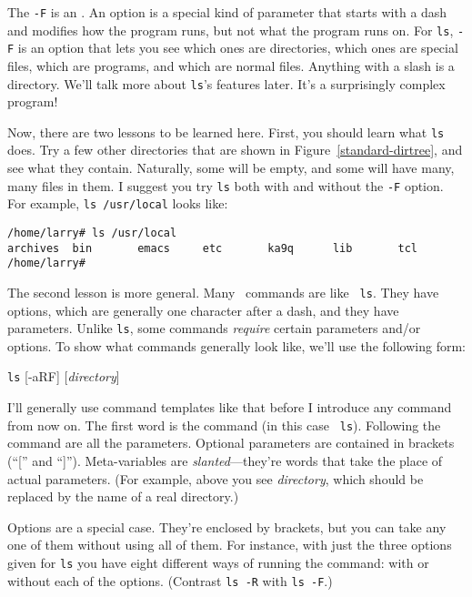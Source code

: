 The {\tt -F} is an .  An option is a special kind of
parameter that starts with a dash and modifies how the program runs,
but not what the program runs on.  For {\tt ls}, {\tt -F} is an option
that lets you see which ones are directories, which ones are special
files, which are programs, and which are normal files.  Anything with
a slash is a directory. We'll talk more about {\tt ls}'s features
later. It's a surprisingly complex program!

Now, there are two lessons to be learned here. First, you should learn
what {\tt ls} does. Try a few other directories that are shown in
Figure~\ref{standard-dirtree}, and see what they contain. Naturally,
some will be empty, and some will have many, many files in them.  I
suggest you try {\tt ls} both with and without the {\tt -F} option.
For example, {\tt ls /usr/local} looks like:

\begin{screen}\begin{verbatim}
/home/larry# ls /usr/local
archives  bin       emacs     etc       ka9q      lib       tcl
/home/larry# 
\end{verbatim}
\end{screen}

The second lesson is more general. Many \unix\ commands are like {\tt
  ls}. They have options, which are generally one character after a
dash, and they have parameters.  Unlike {\tt ls}, some commands
\emph{require} certain parameters and/or options.  To show what
commands generally look like, we'll use the following form:

\begin{command}
{\tt ls} [-aRF] [{\sl directory}]
\end{command}

I'll generally use command templates like that before I introduce any
command from now on.  The first word is the command (in this case {\tt
  ls}).  Following the command are all the parameters.  Optional
parameters are contained in brackets (``['' and ``]'').
Meta-variables are {\sl slanted\/}---they're words that take the place
of actual parameters.  (For example, above you see {\sl directory},
which should be replaced by the name of a real directory.)

Options are a special case.  They're enclosed by brackets, but you can
take any one of them without using all of them.  For instance, with
just the three options given for {\tt ls} you have eight different
ways of running the command: with or without each of the options.
(Contrast {\tt ls -R} with {\tt ls -F}.)

